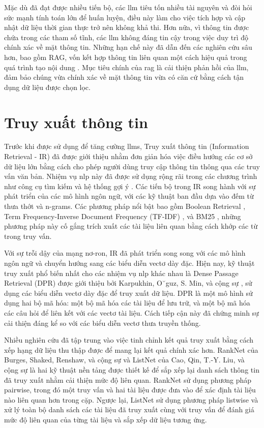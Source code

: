 Mặc dù đã đạt được nhiều tiến bộ, các \gls{llm} tiêu tốn nhiều tài nguyên và đòi hỏi sức mạnh tính toán lớn để huấn luyện, điều này làm cho việc tích hợp và cập nhật dữ liệu thời gian thực trở nên không khả thi. Hơn nữa, vì thông tin được chứa trong các tham số tĩnh, các \gls{llm} không đáng tin cậy trong việc duy trì độ chính xác về mặt thông tin. Những hạn chế này đã dẫn đến các nghiên cứu sâu hơn, bao gồm RAG, vốn kết hợp thông tin liên quan một cách hiệu quả trong quá trình tạo nội dung \cite{gao2023retrievalaugmented}. Mục tiêu chính của \gls{rag} là cải thiện phản hồi của \gls{llm}, đảm bảo chúng vừa chính xác về mặt thông tin vừa có căn cứ bằng cách tận dụng dữ liệu được chọn lọc.


\section{Truy xuất thông tin}
\label{section:information_retrieval}


Trước khi được sử dụng để tăng cường \gls{llm}s, Truy xuất thông tin (Information Retrieval - IR) đã được giới thiệu nhằm đơn giản hóa việc điều hướng các cơ sở dữ liệu lớn bằng cách cho phép người dùng truy cập thông tin thông qua các truy vấn văn bản. Nhiệm vụ \gls{nlp} này đã được sử dụng rộng rãi trong các chương trình như công cụ tìm kiếm và hệ thống gợi ý \cite{li2024matching}. Các tiến bộ trong IR song hành với sự phát triển của các mô hình ngôn ngữ, với các kỹ thuật ban đầu dựa vào đếm từ thưa thớt và n-grams. Các phương pháp nổi bật bao gồm Boolean Retrieval \cite{salton1983extended}, Term Frequency-Inverse Document Frequency (TF-IDF) \cite{luhn1957statistical}, và BM25 \cite{robertson2009probabilistic}, những phương pháp này cố gắng trích xuất các tài liệu liên quan bằng cách khớp các từ trong truy vấn.


Với sự trỗi dậy của mạng nơ-ron, IR đã phát triển song song với các mô hình ngôn ngữ và chuyển hướng sang các biểu diễn vectơ dày đặc. Hiện nay, kỹ thuật truy xuất phổ biến nhất cho các nhiệm vụ \gls{nlp} khác nhau là Dense Passage Retrieval (DPR) được giới thiệu bởi Karpukhin, O˘guz, S. Min, và cộng sự \cite{karpukhin2020dense}, sử dụng các biểu diễn vectơ dày đặc để truy xuất dữ liệu. DPR là một mô hình sử dụng hai bộ mã hóa: một bộ mã hóa các tài liệu để lưu trữ, và một bộ mã hóa các câu hỏi để liên kết với các vectơ tài liệu. Cách tiếp cận này đã chứng minh sự cải thiện đáng kể so với các biểu diễn vectơ thưa truyền thống.


Nhiều nghiên cứu đã tập trung vào việc tinh chỉnh kết quả truy xuất bằng cách xếp hạng dữ liệu thu thập được để mang lại kết quả chính xác hơn. RankNet của Burges, Shaked, Renshaw, và cộng sự \cite{burges2005learning} và ListNet của Cao, Qin, T.-Y. Liu, và cộng sự \cite{cao2007learning} là hai kỹ thuật nền tảng được thiết kế để sắp xếp lại danh sách thông tin đã truy xuất nhằm cải thiện mức độ liên quan. RankNet sử dụng phương pháp pairwise, trong đó một truy vấn và hai tài liệu được đưa vào để xác định tài liệu nào liên quan hơn trong cặp. Ngược lại, ListNet sử dụng phương pháp listwise và xử lý toàn bộ danh sách các tài liệu đã truy xuất cùng với truy vấn để đánh giá mức độ liên quan của từng tài liệu và sắp xếp dữ liệu tương ứng.


